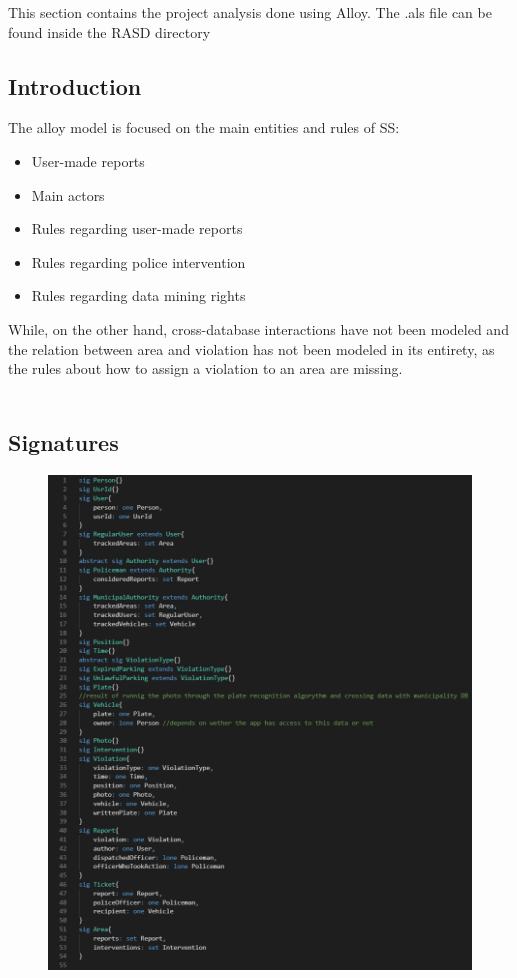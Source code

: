 
This section contains the project analysis done using Alloy. The .als file can be found inside the RASD directory \\
\subsection{Introduction}
The alloy model is focused on the main entities and rules of SS:
\begin{itemize}
	\item User-made reports
	\item Main actors
	\item Rules regarding user-made reports
	\item Rules regarding police intervention
	\item Rules regarding data mining rights
\end{itemize}
While, on the other hand, cross-database interactions have not been modeled and the relation between area and violation has not been modeled in its entirety, as the rules about how to assign a violation to an area are missing.\\  
\\
\newpage
\subsection{Signatures}
\begin{figure}[h]
	\includegraphics[scale=0.50, width=\textwidth]{Images/Signatures_1-0}
\end{figure}
\newpage
